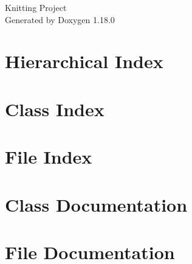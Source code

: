 \documentclass[twoside]{book}
\newcommand{\+}{\discretionary{\mbox{\scriptsize$\hookleftarrow$}}{}{}}
\newcommand{\clearemptydoublepage}{%
    \newpage{\pagestyle{empty}\cleardoublepage}%
  }
\begin{document}
  \raggedbottom
    \hypersetup{pageanchor=false,
                bookmarksnumbered=true,
                pdfencoding=unicode
               }
  \begin{titlepage}
  \vspace*{7cm}
  \begin{center}%
  {\Large Knitting Project}\\
  \vspace*{1cm}
  {\large Generated by Doxygen 1.18.0}\\
  \end{center}
  \end{titlepage}
  \clearemptydoublepage
  \tableofcontents
  \clearemptydoublepage
  \hypersetup{pageanchor=true}
\chapter{Hierarchical Index}

\chapter{Class Index}

\chapter{File Index}

\chapter{Class Documentation}
















\chapter{File Documentation}




  \backmatter
  \newpage
  \clearemptydoublepage
  \printindex
\end{document}
